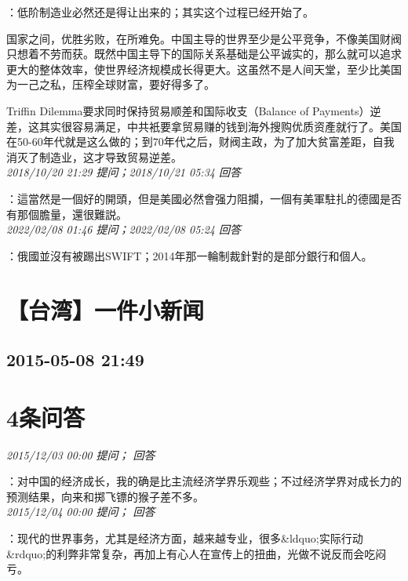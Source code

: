 \documentclass[twocolumn]{ctexart}
\begin{document}
：低阶制造业必然还是得让出来的；其实这个过程已经开始了。

国家之间，优胜劣败，在所难免。中国主导的世界至少是公平竞争，不像美国财阀只想着不劳而获。既然中国主导下的国际关系基础是公平诚实的，那么就可以追求更大的整体效率，使世界经济规模成长得更大。这虽然不是人间天堂，至少比美国为一己之私，压榨全球财富，要好得多了。

Triffin Dilemma要求同时保持贸易顺差和国际收支（Balance of Payments）逆差，这其实很容易满足，中共衹要拿贸易赚的钱到海外搜购优质资產就行了。美国在50-60年代就是这么做的；到70年代之后，财阀主政，为了加大贫富差距，自我消灭了制造业，这才导致贸易逆差。\\

\textit{\hfill\noindent\small 2018/10/20 21:29 提问；2018/10/21 05:34 回答}

：這當然是一個好的開頭，但是美國必然會强力阻攔，一個有美軍駐扎的德國是否有那個膽量，還很難説。
\\

\textit{\hfill\noindent\small 2022/02/08 01:46 提问；2022/02/08 05:24 回答}

：俄國並沒有被踢出SWIFT；2014年那一輪制裁針對的是部分銀行和個人。
\\


\section{【台湾】一件小新闻}
\subsection{2015-05-08 21:49}


\section{4条问答}

\textit{\hfill\noindent\small 2015/12/03 00:00 提问； 回答}

：对中国的经济成长，我的确是比主流经济学界乐观些；不过经济学界对成长力的预测结果，向来和掷飞镖的猴子差不多。\\

\textit{\hfill\noindent\small 2015/12/04 00:00 提问； 回答}

：现代的世界事务，尤其是经济方面，越来越专业，很多\&ldquo;实际行动\&rdquo;的利弊非常复杂，再加上有心人在宣传上的扭曲，光做不说反而会吃闷亏。
\end{document}
